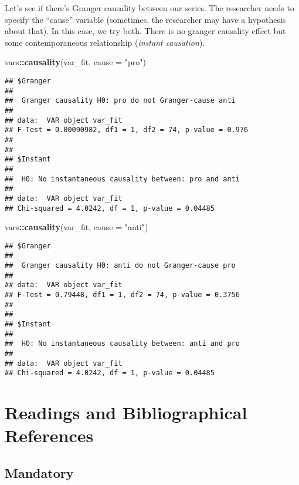 \documentclass[
]{article}
\newenvironment{Shaded}{\begin{snugshade}}{\end{snugshade}}
\newcommand{\AttributeTok}[1]{\textcolor[rgb]{0.13,0.29,0.53}{#1}}
\newcommand{\FunctionTok}[1]{\textcolor[rgb]{0.13,0.29,0.53}{\textbf{#1}}}
\newcommand{\NormalTok}[1]{#1}
\newcommand{\SpecialCharTok}[1]{\textcolor[rgb]{0.81,0.36,0.00}{\textbf{#1}}}
\newcommand{\StringTok}[1]{\textcolor[rgb]{0.31,0.60,0.02}{#1}}
\begin{document}
Let's see if there's Granger causality between our series. The researcher needs to specify the ``cause'' variable (sometimes, the researcher may have a hypothesis about that). In this case, we try both. There is no granger causality effect but some contemporaneous relationship (\emph{instant causation}).

\begin{Shaded}
\begin{Highlighting}[]
\NormalTok{vars}\SpecialCharTok{::}\FunctionTok{causality}\NormalTok{(var\_fit, }\AttributeTok{cause =} \StringTok{"pro"}\NormalTok{)}
\end{Highlighting}
\end{Shaded}

\begin{verbatim}
## $Granger
## 
##  Granger causality H0: pro do not Granger-cause anti
## 
## data:  VAR object var_fit
## F-Test = 0.00090982, df1 = 1, df2 = 74, p-value = 0.976
## 
## 
## $Instant
## 
##  H0: No instantaneous causality between: pro and anti
## 
## data:  VAR object var_fit
## Chi-squared = 4.0242, df = 1, p-value = 0.04485
\end{verbatim}

\begin{Shaded}
\begin{Highlighting}[]
\NormalTok{vars}\SpecialCharTok{::}\FunctionTok{causality}\NormalTok{(var\_fit, }\AttributeTok{cause =} \StringTok{"anti"}\NormalTok{)}
\end{Highlighting}
\end{Shaded}

\begin{verbatim}
## $Granger
## 
##  Granger causality H0: anti do not Granger-cause pro
## 
## data:  VAR object var_fit
## F-Test = 0.79448, df1 = 1, df2 = 74, p-value = 0.3756
## 
## 
## $Instant
## 
##  H0: No instantaneous causality between: anti and pro
## 
## data:  VAR object var_fit
## Chi-squared = 4.0242, df = 1, p-value = 0.04485
\end{verbatim}

\section{Readings and Bibliographical References}\label{readings-and-bibliographical-references}

\subsection{Mandatory}\label{mandatory}
\end{document}
